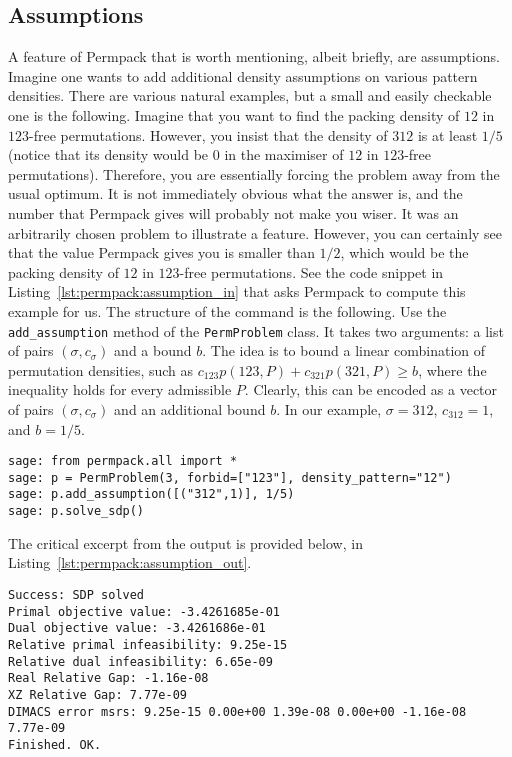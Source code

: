 \documentclass[12pt, a4paper, twoside]{report}
\begin{document}
\subsection{Assumptions}
A feature of Permpack that is worth mentioning, albeit briefly, are assumptions. Imagine one wants to add additional density assumptions on various pattern densities. There are various natural examples, but a small and easily checkable one is the following. Imagine that you want to find the packing density of $12$ in $123$-free permutations. However, you insist that the density of $312$ is at least $1/5$ (notice that its density would be $0$ in the maximiser of $12$ in $123$-free permutations). Therefore, you are essentially forcing the problem away from the usual optimum. It is not immediately obvious what the answer is, and the number that Permpack gives will probably not make you wiser. It was an arbitrarily chosen problem to illustrate a feature. However, you can certainly see that the value Permpack gives you is smaller than $1/2$, which would be the packing density of $12$ in $123$-free permutations. See the code snippet in Listing~\ref{lst:permpack:assumption_in} that asks Permpack to compute this example for us. The structure of the command is the following. Use the \texttt{add\_assumption} method of the \texttt{PermProblem} class. It takes two arguments: a list of pairs $(\sigma,c_\sigma)$ and a bound $b$. The idea is to bound a linear combination of permutation densities, such as $c_{123}p(123,P) + c_{321}p(321,P) \geq b$, where the inequality holds for every admissible $P$. Clearly, this can be encoded as a vector of pairs $(\sigma,c_\sigma)$ and an additional bound $b$. In our example, $\sigma = 312$, $c_{312} = 1$, and $b = 1/5$. 

 {}
\begin{lstlisting}
sage: from permpack.all import *
sage: p = PermProblem(3, forbid=["123"], density_pattern="12")
sage: p.add_assumption([("312",1)], 1/5)
sage: p.solve_sdp()
\end{lstlisting}

The critical excerpt from the output is provided below, in Listing~\ref{lst:permpack:assumption_out}.

\begin{lstlisting}
Success: SDP solved
Primal objective value: -3.4261685e-01 
Dual objective value: -3.4261686e-01 
Relative primal infeasibility: 9.25e-15 
Relative dual infeasibility: 6.65e-09 
Real Relative Gap: -1.16e-08 
XZ Relative Gap: 7.77e-09 
DIMACS error msrs: 9.25e-15 0.00e+00 1.39e-08 0.00e+00 -1.16e-08 7.77e-09
Finished. OK.
\end{lstlisting}
\end{document}
